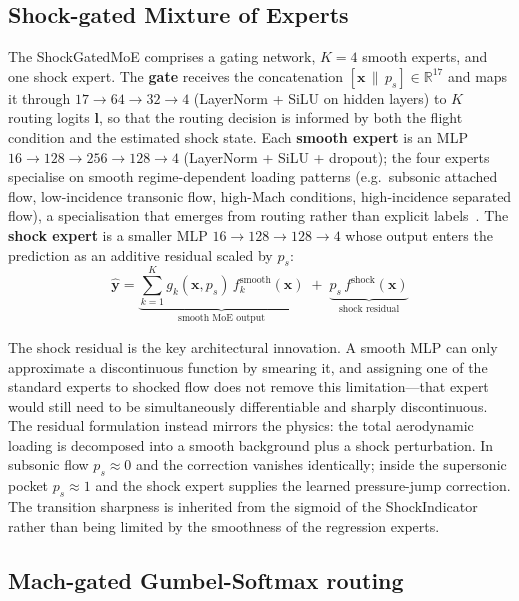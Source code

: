 \documentclass{WCCM-ECCOMAS_2026_Full_Paper}
\begin{document}
\subsection{Shock-gated Mixture of Experts}
\label{sec:moe}

The ShockGatedMoE comprises a gating network, $K=4$ smooth experts,
and one shock expert.  The \textbf{gate} receives the concatenation
$[\mathbf{x}\,\|\,p_s]\in\mathbb{R}^{17}$ and maps it through
$17\!\to\!64\!\to\!32\!\to\!4$ (LayerNorm + SiLU on hidden layers) to
$K$ routing logits $\mathbf{l}$, so that the routing decision is
informed by both the flight condition and the estimated shock state.
Each \textbf{smooth expert} is an MLP
$16\!\to\!128\!\to\!256\!\to\!128\!\to\!4$ (LayerNorm + SiLU +
dropout); the four experts specialise on smooth regime-dependent
loading patterns (e.g.\ subsonic attached flow, low-incidence
transonic flow, high-Mach conditions, high-incidence separated flow),
a specialisation that emerges from routing rather than explicit
labels~\cite{Jacobs1991,Shazeer2017}.  The \textbf{shock expert} is a
smaller MLP $16\!\to\!128\!\to\!128\!\to\!4$ whose output enters the
prediction as an additive residual scaled by $p_s$:
\begin{equation}
  \hat{\mathbf{y}} =
    \underbrace{\sum_{k=1}^{K} g_{k}(\mathbf{x}, p_s)\,
                f_{k}^{\mathrm{smooth}}(\mathbf{x})}_{\text{smooth MoE output}}
    \;+\;
    \underbrace{p_s\, f^{\mathrm{shock}}(\mathbf{x})}_{\text{shock residual}}
  \label{eq:forward}
\end{equation}

The shock residual is the key architectural innovation.  A smooth MLP
can only approximate a discontinuous function by smearing it, and
assigning one of the standard experts to shocked flow does not remove
this limitation---that expert would still need to be simultaneously
differentiable and sharply discontinuous.  The residual formulation
instead mirrors the physics: the total aerodynamic loading is
decomposed into a smooth background plus a shock perturbation.  In
subsonic flow $p_s\!\approx\!0$ and the correction vanishes
identically; inside the supersonic pocket $p_s\!\approx\!1$ and the
shock expert supplies the learned pressure-jump correction.  The
transition sharpness is inherited from the sigmoid of the
ShockIndicator rather than being limited by the smoothness of the
regression experts.

\subsection{Mach-gated Gumbel-Softmax routing}
\label{sec:gumbel}
\end{document}
